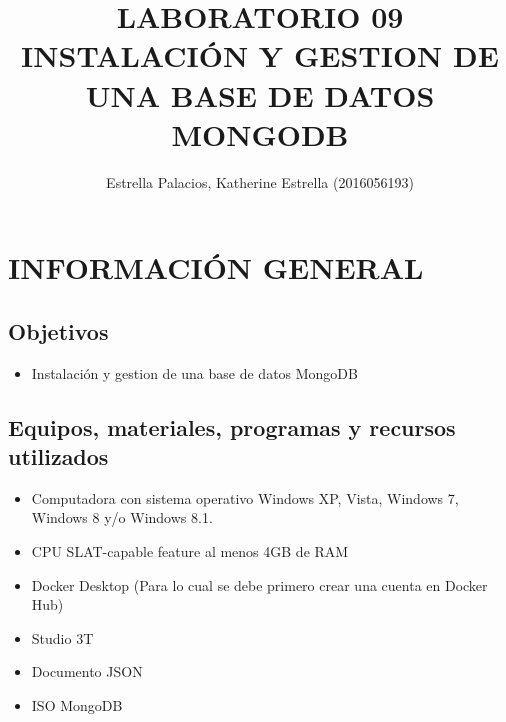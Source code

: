 \documentclass[preprint,12pt]{elsarticle}
\begin{document}
	
	\begin{frontmatter} 

		\title{\huge LABORATORIO 09 INSTALACIÓN Y GESTION DE UNA BASE DE DATOS MONGODB}
		
		\author{Estrella Palacios, Katherine Estrella         	(2016056193)} 
		\address{Escuela Profesional de Ingeniería de Sistemas}
		\address{Universidad Privada de Tacna}
		\address{Tacna, Perú}
		

	\end{frontmatter}


\section{INFORMACIÓN GENERAL} 

\subsection {\textbf{Objetivos}}
\begin{itemize}
	\item Instalación y gestion de una base de datos MongoDB
\end{itemize}

\subsection {\textbf{Equipos, materiales, programas y recursos utilizados}}
\begin{itemize}
	\item Computadora con sistema operativo Windows XP, Vista, Windows 7, Windows 8 y/o Windows 8.1.
	\item CPU SLAT-capable feature al menos 4GB de RAM
	\item Docker Desktop (Para lo cual se debe primero crear una cuenta en Docker Hub)
	\item Studio 3T
	\item Documento JSON
	\item ISO MongoDB
\end{itemize}



\end{document}
